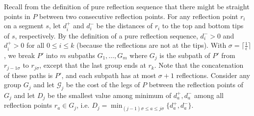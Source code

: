 \documentclass[10pt,a4paper]{amsart}
\theoremstyle{thmstyleone}
\begin{document}
Recall from the definition of pure reflection sequence that there might be straight points in $P$ between two consecutive reflection points.
For any reflection point $r_i$ on a segment $s$, let $ d_i^+ $ and $ d_i^- $ be the distances of $r_i$ to the top and bottom tips of $s$, respectively. 
By the definition of a pure reflection sequence, $d^-_i > 0 $ and $ d_i^+ > 0 $ for all $0\leq i\leq k $ (because the reflections are not at the tips). 
With  $\sigma=\lceil\frac 1\epsilon\rceil$, we break $P'$ into $m$ subpaths $G_1,\ldots,G_m$ where $G_j$ is the subpath of $P'$ from $r_{{j-1}\sigma}$ to $r_{j\sigma}$,
except that the last group ends at $r_k$. Note that the concatenation of these paths is $P'$, and each subpath has at most $\sigma+1$ reflections.
Consider any group $G_j$ and let $\mathcal G_j$  be the cost of the legs of $P$ between the reflection points of $G_j$ and let $D_j$ be the smallest value among minimum of $d^+_a,d^-_a$ among all reflection points $r_a\in G_j$, i.e. $D_j=\min_{(j-1)\sigma\leq a\leq j\sigma}\{d^+_a,d^-_a\}$.
\end{document}
